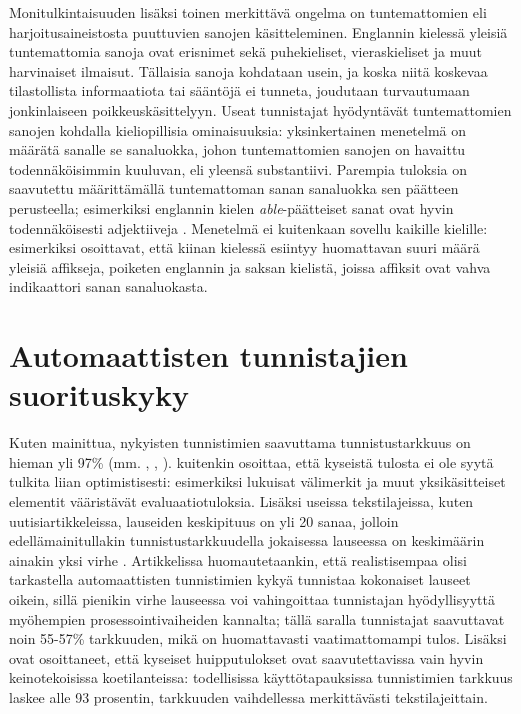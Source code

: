 \documentclass[utf8,bachelor,manualbib]{gradu3}
\begin{document}
Monitulkintaisuuden lisäksi toinen merkittävä ongelma on tuntemattomien eli harjoitusaineistosta puuttuvien sanojen käsitteleminen. Englannin kielessä yleisiä tuntemattomia sanoja ovat erisnimet sekä puhekieliset, vieraskieliset ja muut harvinaiset ilmaisut. Tällaisia sanoja kohdataan usein, ja koska niitä koskevaa tilastollista informaatiota tai sääntöjä ei tunneta, joudutaan turvautumaan jonkinlaiseen poikkeuskäsittelyyn. Useat tunnistajat hyödyntävät tuntemattomien sanojen kohdalla kieliopillisia ominaisuuksia: yksinkertainen menetelmä on määrätä sanalle se sanaluokka, johon tuntemattomien sanojen on havaittu todennäköisimmin kuuluvan, eli yleensä substantiivi. Parempia tuloksia on saavutettu määrittämällä tuntemattoman sanan sanaluokka sen päätteen perusteella; esimerkiksi englannin kielen \emph{able}-päätteiset sanat ovat hyvin todennäköisesti adjektiiveja \citep{samuelsson1993}. Menetelmä ei kuitenkaan sovellu kaikille kielille: esimerkiksi \citet{tseng2005} osoittavat, että kiinan kielessä esiintyy huomattavan suuri määrä yleisiä affikseja, poiketen englannin ja saksan kielistä, joissa affiksit ovat vahva indikaattori sanan sanaluokasta.


\section{Automaattisten tunnistajien suorituskyky}

Kuten mainittua, nykyisten tunnistimien saavuttama tunnistustarkkuus on hieman yli 97\%  (mm. \citealp{toutanova2003}, \citealp{shen2007}, \citealp{spoustova2009}). \citet{manning2011} kuitenkin osoittaa, että kyseistä tulosta ei ole syytä tulkita liian optimistisesti: esimerkiksi lukuisat välimerkit ja muut yksikäsitteiset elementit vääristävät evaluaatiotuloksia. Lisäksi useissa tekstilajeissa, kuten uutisiartikkeleissa, lauseiden keskipituus on yli 20 sanaa, jolloin edellämainitullakin tunnistustarkkuudella jokaisessa lauseessa on keskimäärin ainakin yksi virhe \citep{manning1999}. Artikkelissa huomautetaankin, että realistisempaa olisi tarkastella automaattisten tunnistimien kykyä tunnistaa kokonaiset lauseet oikein, sillä pienikin virhe lauseessa voi vahingoittaa tunnistajan hyödyllisyyttä myöhempien prosessointivaiheiden kannalta; tällä saralla tunnistajat saavuttavat noin 55-57\% tarkkuuden, mikä on huomattavasti vaatimattomampi tulos. Lisäksi  ovat osoittaneet, että kyseiset huipputulokset ovat saavutettavissa vain hyvin keinotekoisissa koetilanteissa: todellisissa käyttötapauksissa tunnistimien tarkkuus laskee alle 93 prosentin, tarkkuuden vaihdellessa merkittävästi tekstilajeittain.
\end{document}

